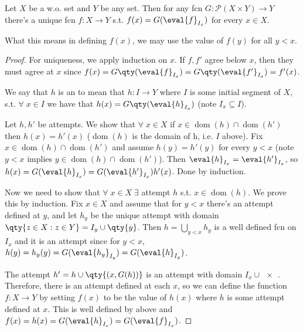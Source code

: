 \begin{theorem}
    Let $X$ be a w.o. set and $Y$ be any set.
    Then for any fcn $G \colon \mathcal{P}(X \times Y) \to Y$ there's a unique fcn $f : X \to Y$ s.t. $f(x) = G(\eval{f}_{I_x})$ for every $x \in X$.
\end{theorem}

\begin{remark}
    What this means in defining $f(x)$, we may use the value of $f(y)$ for all $y < x$.
\end{remark}

\begin{proof}
    For uniqueness, we apply induction on $x$.
    If $f, f'$ agree below $x$, then they must agree at $x$ since $f(x) = G\qty(\eval{f}_{I_x}) = G\qty(\eval{f'}_{I_x}) = f'(x)$.

    We say that $h$ is an  to mean that $h \colon I \to Y$ where $I$ is some initial segment of $X$, s.t. $\forall \; x \in I$ we have that $h(x) = G\qty(\eval{h}_{I_x})$ (note $I_x \subseteq I$).

    Let $h, h'$ be attempts.
    We show that $\forall \; x \in X$ if $x \in \operatorname{dom}(h) \cap \operatorname{dom}(h')$ then $h(x) = h'(x)$ ($\operatorname{dom}(h)$ is the domain of h, i.e. $I$ above).
    Fix $x \in \operatorname{dom}(h) \cap \operatorname{dom}(h')$ and assume $h(y) = h'(y)$ for every $y < x$ (note $y < x$ implies $y \in \operatorname{dom}(h) \cap \operatorname{dom}(h')$).
    Then $\eval{h}_{I_x} = \eval{h'}_{I_x}$, so $h(x) = G(\eval{h}_{I_x}) = G(\eval{h'}_{I_x}) h'(x)$.
    Done by induction.

    Now we need to show that $\forall \; x \in X \; \exists$ attempt $h$ s.t. $x \in \operatorname{dom}(h)$.
    We prove this by induction.
    Fix $x \in X$ and assume that for $y < x$ there's an attempt defined at $y$, and let $h_y$ be the unique attempt with domain $\qty{z \in X : z \in Y} = I_y \cup \qty{y}$.
    Then $h = \bigcup_{y < x} h_y$ is a well defined fcn on $I_x$ and it is an attempt since for $y < x$, $h(y) = h_y(y) = G(\eval{h_y}_{I_y}) = G(\eval{h}_{I_y})$.

    The attempt $h' = h \cup \qty{(x, G(h))}$ is an attempt with domain $I_x \cup \qty{x}$.
    Therefore, there is an attempt defined at each $x$, so we can define the function $f \colon X \to Y$ by setting $f(x)$ to be the value of $h(x)$ where $h$ is some attempt defined at $x$.
    This is well defined by above and $f(x) = h(x) = G(\eval{h}_{I_x}) = G(\eval{f}_{I_x})$.
\end{proof}

